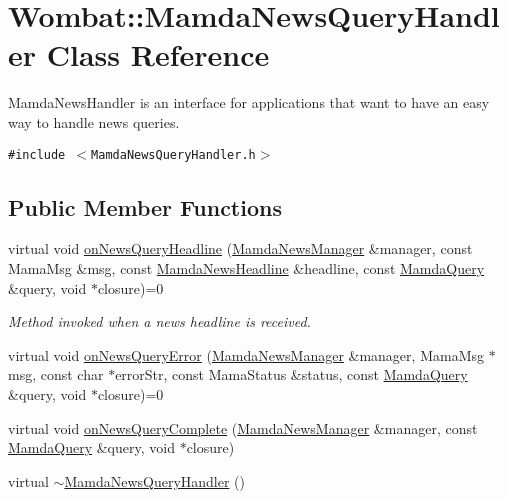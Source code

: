 \hypertarget{classWombat_1_1MamdaNewsQueryHandler}{
\section{Wombat::Mamda\-News\-Query\-Handler Class Reference}
\label{classWombat_1_1MamdaNewsQueryHandler}
}
Mamda\-News\-Handler is an interface for applications that want to have an easy way to handle news queries.  


{\tt \#include $<$Mamda\-News\-Query\-Handler.h$>$}

\subsection*{Public Member Functions}
\begin{CompactItemize}
\item 
virtual void \hyperlink{classWombat_1_1MamdaNewsQueryHandler_3ce9f8db36f347d0fedd9a85ef3d6d5d}{on\-News\-Query\-Headline} (\hyperlink{classWombat_1_1MamdaNewsManager}{Mamda\-News\-Manager} \&manager, const Mama\-Msg \&msg, const \hyperlink{classWombat_1_1MamdaNewsHeadline}{Mamda\-News\-Headline} \&headline, const \hyperlink{classWombat_1_1MamdaQuery}{Mamda\-Query} \&query, void $\ast$closure)=0
\begin{CompactList}\small\item\em Method invoked when a news headline is received. \item\end{CompactList}\item 
virtual void \hyperlink{classWombat_1_1MamdaNewsQueryHandler_10584e9759028e8f7896423c848cb08f}{on\-News\-Query\-Error} (\hyperlink{classWombat_1_1MamdaNewsManager}{Mamda\-News\-Manager} \&manager, Mama\-Msg $\ast$msg, const char $\ast$error\-Str, const Mama\-Status \&status, const \hyperlink{classWombat_1_1MamdaQuery}{Mamda\-Query} \&query, void $\ast$closure)=0
\item 
virtual void \hyperlink{classWombat_1_1MamdaNewsQueryHandler_5c419b05befece5ad135ab983fc8f5ac}{on\-News\-Query\-Complete} (\hyperlink{classWombat_1_1MamdaNewsManager}{Mamda\-News\-Manager} \&manager, const \hyperlink{classWombat_1_1MamdaQuery}{Mamda\-Query} \&query, void $\ast$closure)
\item 
virtual \hyperlink{classWombat_1_1MamdaNewsQueryHandler_8ef2b61870d827f05705231859a901c9}{$\sim$Mamda\-News\-Query\-Handler} ()
\end{CompactItemize}



